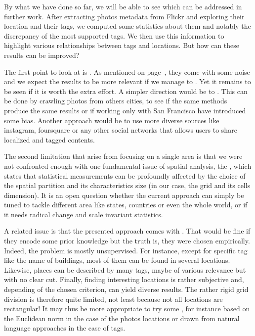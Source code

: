 By  what we have done so far, we will be able to see
which  can be addressed in further work. After
extracting photos metadata from Flickr and exploring their location and their
tags, we computed some statistics about them and notably the discrepancy of
the most supported tags. We then use this information to highlight various
relationships between tags and locations. But how can these results can be
improved?

\medskip

The first point to look at is . As mentioned on
page~\pageref{p:data}, they come with some noise and we expect the results to
be more relevant if we manage to . Yet it remains to be
seen if it is worth the extra effort. A simpler direction would be to
. This can be done by crawling photos from
others cities, to see if the same methods produce the same results or if
working only with San Francisco have introduced some bias. Another approach
would be to use more diverse sources like instagram, foursquare or any other
social networks that allows users to share localized and tagged contents.


The second limitation that arise from focusing on a single area is that we
were not confronted enough with one fundamental issue of spatial analysis, the
\cite{scale}, which states that
statistical measurements can be profoundly affected by the choice of the
spatial partition and its characteristics size (in our case, the grid and its
cells dimension).  It is an open question whether the current approach can
simply be tuned to tackle different area like states, countries or even the
whole world, or if it needs radical change and scale invariant statistics.

A related issue is that the presented approach comes with . That would be fine if they encode some prior
knowledge but the truth is, they were chosen empirically. Indeed, the problem
is mostly unsupervised. For instance, except for specific tag like the name of
buildings, most of them can be found in several locations. Likewise, places
can be described by many tags, maybe of various relevance but with no clear
cut. Finally, finding interesting locations is rather subjective and,
depending of the chosen criterion, can yield diverse results. The rather rigid
grid division is therefore quite limited, not least because not all locations
are rectangular! It may thus be more appropriate to try some
, for instance based on the
Euclidean norm in the case of the photos locations or drawn from natural
language  approaches in the case of
tags\cite{topicModel}.


